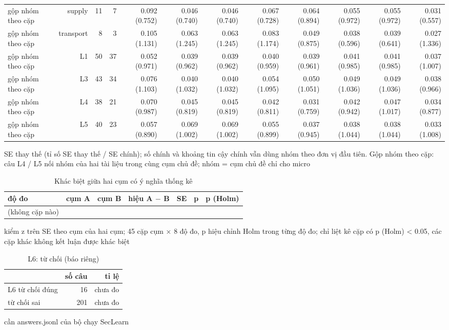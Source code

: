 \begin{table}[ht]
\begin{tabular}{lrrrrrrrrrrr}
gộp nhóm theo cặp & supply & 11 & 7 & 0.092 (0.752) & 0.046 (0.740) & 0.046 (0.740) & 0.067 (0.728) & 0.064 (0.894) & 0.055 (0.972) & 0.055 (0.972) & 0.031 (0.557) \\
gộp nhóm theo cặp & transport & 8 & 3 & 0.105 (1.131) & 0.063 (1.245) & 0.063 (1.245) & 0.083 (1.174) & 0.049 (0.875) & 0.038 (0.596) & 0.039 (0.641) & 0.027 (1.336) \\
gộp nhóm theo cặp & L1 & 50 & 37 & 0.052 (0.971) & 0.039 (0.962) & 0.039 (0.962) & 0.040 (0.959) & 0.039 (0.961) & 0.041 (0.985) & 0.041 (0.985) & 0.037 (1.007) \\
gộp nhóm theo cặp & L3 & 43 & 34 & 0.076 (1.103) & 0.040 (1.032) & 0.040 (1.032) & 0.054 (1.095) & 0.050 (1.051) & 0.049 (1.036) & 0.049 (1.036) & 0.038 (0.966) \\
gộp nhóm theo cặp & L4 & 38 & 21 & 0.070 (0.987) & 0.045 (0.819) & 0.045 (0.819) & 0.042 (0.811) & 0.031 (0.759) & 0.042 (0.942) & 0.047 (1.017) & 0.034 (0.877) \\
gộp nhóm theo cặp & L5 & 40 & 23 & 0.057 (0.890) & 0.069 (1.002) & 0.069 (1.002) & 0.055 (0.899) & 0.037 (0.945) & 0.038 (1.044) & 0.038 (1.044) & 0.033 (1.008) \\
\bottomrule
\end{tabular}
\par\smallskip\footnotesize SE thay thế (tỉ số SE thay thế / SE chính); số chính và khoảng tin cậy chính vẫn dùng nhóm theo đơn vị đầu tiên. Gộp nhóm theo cặp: câu L4 / L5 nối nhóm của hai tài liệu trong cùng cụm chủ đề; nhóm = cụm chủ đề chỉ cho micro
\end{table}

\begin{table}[ht]
\centering
\caption{Khác biệt giữa hai cụm có ý nghĩa thống kê}
\begin{tabular}{lrrrrrr}
\toprule
độ đo & cụm A & cụm B & hiệu A $-$ B & SE & p & p (Holm) \\
\midrule
(không cặp nào) &  &  &  &  &  &  \\
\bottomrule
\end{tabular}
\par\smallskip\footnotesize kiểm z trên SE theo cụm của hai cụm; 45 cặp cụm × 8 độ đo, p hiệu chỉnh Holm trong từng độ đo; chỉ liệt kê cặp có p (Holm) < 0.05, các cặp khác không kết luận được khác biệt
\end{table}

\begin{table}[ht]
\centering
\caption{L6: từ chối (báo riêng)}
\begin{tabular}{lrr}
\toprule
 & số câu & tỉ lệ \\
\midrule
L6 từ chối đúng & 16 & chưa đo \\
từ chối sai & 201 & chưa đo \\
\bottomrule
\end{tabular}
\par\smallskip\footnotesize cần answers.jsonl của bộ chạy SecLearn
\end{table}
